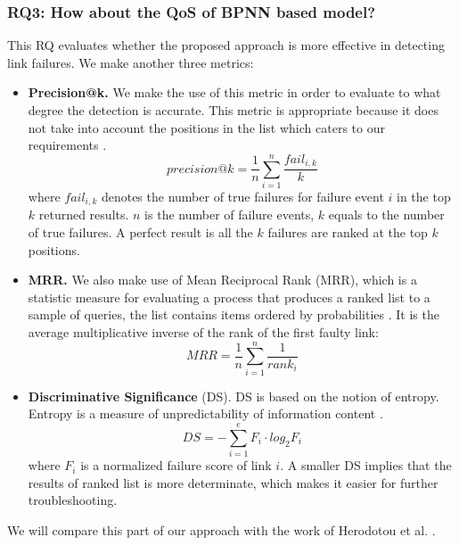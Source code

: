 \documentclass{sig-alternate-05-2015}
\begin{document}
\subsubsection*{RQ3: How about the QoS of BPNN based model?}
\quad This RQ evaluates whether the proposed approach is more effective in detecting link failures. We make another three metrics:
\begin{itemize}
    \item \textbf{Precision@k.} We make the use of this metric in order to evaluate to what degree the detection is accurate. This metric is appropriate because it does not take into account the positions in the list which caters to our requirements \cite{mogotsi2010christopher}.
    \begin{equation}
        precision@k = \frac{1}{n}\sum_{i=1}^n \frac{fail_{i,k}}{k}
    \end{equation}
    where $fail_{i,k}$ denotes the number of true failures for failure event $i$ in the top $k$ returned results. $n$ is the number of failure events, $k$ equals to the number of true failures. A perfect result is all the $k$ failures are ranked at the top $k$ positions.

    \item \textbf{MRR.} We also make use of Mean Reciprocal Rank (MRR), which is a statistic measure for evaluating a process that produces a ranked list to a sample of queries, the list contains items ordered by probabilities \cite{radev2002evaluating}. It is the average multiplicative inverse of the rank of the first faulty link:
        \begin{equation}
            MRR = \frac{1}{n}\sum_{i=1}^n \frac{1}{rank_i}
        \end{equation}

    \item \textbf{Discriminative Significance} (DS). DS is based on the notion of entropy. Entropy is a measure of unpredictability of information content \cite{shannon2001mathematical}.
        \begin{equation}
            DS = -\sum_{i=1}^e F_i \cdot log_2 F_i
        \end{equation}
        where $F_i$ is a normalized failure score of link $i$. A smaller DS implies that the results of ranked list is more determinate, which makes it easier for further troubleshooting.


\end{itemize}

We will compare this part of our approach with the work of Herodotou et al. \cite{herodotou2014scalable}.
\end{document}
